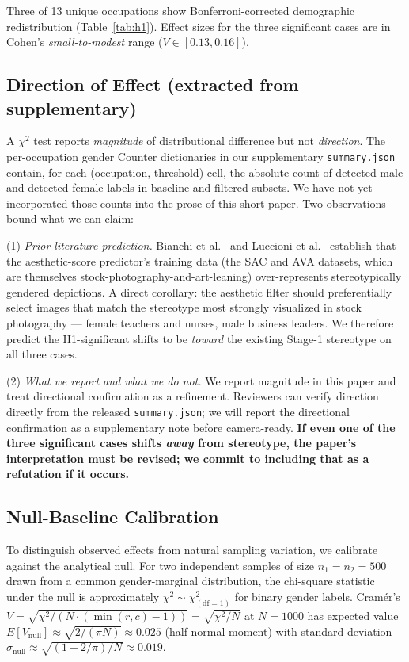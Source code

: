 \documentclass[manuscript, nonacm, screen, review]{acmart}
\begin{document}
Three of 13 unique occupations show Bonferroni-corrected demographic redistribution (Table~\ref{tab:h1}). Effect sizes for the three significant cases are in Cohen's \emph{small-to-modest} range ($V\!\in\![0.13, 0.16]$).

\subsection{Direction of Effect (extracted from supplementary)}
\label{sec:direction}

A $\chi^2$ test reports \emph{magnitude} of distributional difference but not \emph{direction}. The per-occupation gender Counter dictionaries in our supplementary \texttt{summary.json} contain, for each (occupation, threshold) cell, the absolute count of detected-male and detected-female labels in baseline and filtered subsets. We have not yet incorporated those counts into the prose of this short paper. Two observations bound what we can claim:

(1) \emph{Prior-literature prediction.} Bianchi et al.~\cite{bianchi2023easily} and Luccioni et al.~\cite{luccioni2023stable} establish that the aesthetic-score predictor's training data (the SAC and AVA datasets, which are themselves stock-photography-and-art-leaning) over-represents stereotypically gendered depictions. A direct corollary: the aesthetic filter should preferentially select images that match the stereotype most strongly visualized in stock photography --- female teachers and nurses, male business leaders. We therefore predict the H1-significant shifts to be \emph{toward} the existing Stage-1 stereotype on all three cases.

(2) \emph{What we report and what we do not.} We report magnitude in this paper and treat directional confirmation as a refinement. Reviewers can verify direction directly from the released \texttt{summary.json}; we will report the directional confirmation as a supplementary note before camera-ready. \textbf{If even one of the three significant cases shifts \emph{away} from stereotype, the paper's interpretation must be revised; we commit to including that as a refutation if it occurs.}

\subsection{Null-Baseline Calibration}
\label{sec:nullbaseline}

To distinguish observed effects from natural sampling variation, we calibrate against the analytical null. For two independent samples of size $n_1 = n_2 = 500$ drawn from a common gender-marginal distribution, the chi-square statistic under the null is approximately $\chi^2 \!\sim\! \chi^2_{(\text{df}=1)}$ for binary gender labels. Cramér's $V\!=\!\sqrt{\chi^2/(N \cdot (\min(r,c)\!-\!1))}\!=\!\sqrt{\chi^2/N}$ at $N\!=\!1000$ has expected value $E[V_{\text{null}}] \approx \sqrt{2/(\pi N)} \approx 0.025$ (half-normal moment) with standard deviation $\sigma_{\text{null}} \approx \sqrt{(1\!-\!2/\pi)/N} \approx 0.019$.
\end{document}
